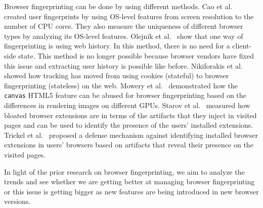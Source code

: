 Browser fingerprinting can be done by using different methods. Cao et al.~\cite{Cao} created user fingerprints by using OS-level features from screen resolution to the number of CPU cores. They also measure the uniqueness of different browser types by analyzing its OS-level features. Olejnik et al.~\cite{Olejnik} show that one way of fingerprinting is using web history. In this method, there is no need for a client-side state. This method is no longer possible because browser vendors have fixed this issue and extracting user history is possible like before. Nikiforakis et al.~\cite{cookiemonster-SP13} showed how tracking has moved from using cookies (stateful) to browser fingerprinting (stateless) on the web. Mowery et al.~\cite{mowery2012pixel} demonstrated how the \texttt{canvas} HTML5 feature can be abused for browser fingerprinting based on the differences in rendering images on different GPUs. Starov et al.~\cite{extbloat-www2019} measured how bloated browser extensions are in terms of the artifacts that they inject in visited pages and can be used to identify the presence of the users' installed extensions. 
Trickel et al.~\cite{cloakx-sec19} proposed a defense mechanism against identifying installed browser extensions in users' browsers based on artifacts that reveal their presence on the visited pages.

In light of the prior research on browser fingerprinting, we aim to analyze the trends and see whether we are getting better at managing browser fingerprinting or this issue is getting bigger as new features are being introduced in new browser versions.